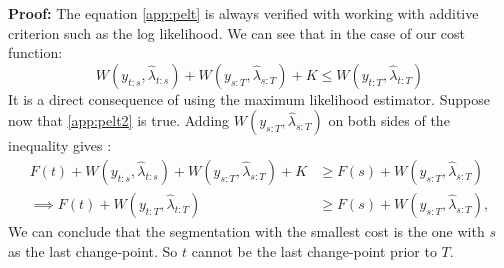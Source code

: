 \begin{appendices}
\textbf{Proof:} The equation \ref{app:pelt} is always verified with working with additive criterion such as the log likelihood. We can see that in the case of our cost function: 
$$W(y_{t:s},\hat\lambda_{t:s})+W(y_{s:T},\hat\lambda_{s:T})+K\leq W(y_{t:T},\hat\lambda_{t:T})$$
It is a direct consequence of using the maximum likelihood estimator. Suppose now that \ref{app:pelt2} is true. Adding $W(y_{s:T},\hat\lambda_{s:T})$ on both sides of the inequality gives : 
\begin{align*}
  F(t)+W(y_{t:s},\hat\lambda_{t:s})+W(y_{s:T},\hat\lambda_{s:T})+K &\geq F(s)+W(y_{s:T},\hat\lambda_{s:T}) \\
  \implies F(t)+W(y_{t:T},\hat\lambda_{t:T}) &\geq F(s)+W(y_{s:T},\hat\lambda_{s:T}),
\end{align*}
We can conclude that the segmentation with the smallest cost is the one with $s$ as the last change-point. So $t$ cannot be the last change-point prior to $T$.







\end{appendices}
